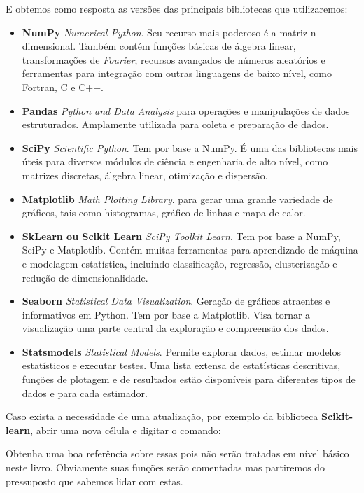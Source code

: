 E obtemos como resposta as versões das principais bibliotecas que utilizaremos: \vspace{-1em}
\begin{itemize}
	\item \textbf{NumPy} \textit{Numerical Python}. Seu recurso mais poderoso é a matriz n-dimensional. Também contém funções básicas de álgebra linear, transformações de \textit{Fourier}, recursos avançados de números aleatórios e ferramentas para integração com outras linguagens de baixo nível, como Fortran, C e C++.
	\item \textbf{Pandas} \textit{Python and Data Analysis} para operações e manipulações de dados estruturados. Amplamente utilizada para coleta e preparação de dados.
	\item \textbf{SciPy} \textit{Scientific Python}. Tem por base a NumPy. É uma das bibliotecas mais úteis para diversos módulos de ciência e engenharia de alto nível, como matrizes discretas, álgebra linear, otimização e dispersão.
	\item \textbf{Matplotlib} \textit{Math Plotting Library}. para gerar uma grande variedade de gráficos, tais como histogramas, gráfico de linhas e mapa de calor.
	\item \textbf{SkLearn ou Scikit Learn} \textit{SciPy Toolkit Learn}. Tem por base a NumPy, SciPy e Matplotlib. Contém muitas ferramentas para aprendizado de máquina e modelagem estatística, incluindo classificação, regressão, clusterização e redução de dimensionalidade.
	\item \textbf{Seaborn} \textit{Statistical Data Visualization}. Geração de gráficos atraentes e informativos em Python. Tem por base a Matplotlib. Visa tornar a visualização uma parte central da exploração e compreensão dos dados.
	\item \textbf{Statsmodels} \textit{Statistical Models}. Permite explorar dados, estimar modelos estatísticos e executar testes. Uma lista extensa de estatísticas descritivas, funções de plotagem e de resultados estão disponíveis para diferentes tipos de dados e para cada estimador.
\end{itemize}

Caso exista a necessidade de uma atualização, por exemplo da biblioteca \textbf{Scikit-learn}, abrir uma nova célula e digitar o comando: \\

\begin{note} 
	Obtenha uma boa referência sobre essas pois não serão tratadas em nível básico neste livro. Obviamente suas funções serão comentadas mas partiremos do pressuposto que sabemos lidar com estas.
\end{note}

